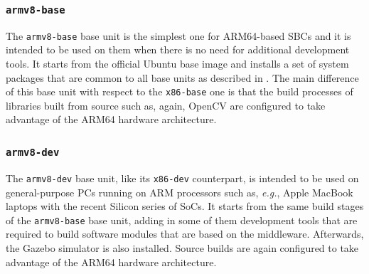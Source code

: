 \subsubsection{\texttt{armv8-base}}
\label{sec:dua_base_units_armv8-base}
The \texttt{armv8-base} base unit is the simplest one for ARM64-based SBCs and it is intended to be used on them when there is no need for additional development tools. It starts from the official Ubuntu base image and installs a set of system packages that are common to all base units as described in . The main difference of this base unit with respect to the \texttt{x86-base} one is that the build processes of libraries built from source such as, again, OpenCV are configured to take advantage of the ARM64 hardware architecture.

\subsubsection{\texttt{armv8-dev}}
\label{sec:dua_base_units_armv8-dev}
The \texttt{armv8-dev} base unit, like its \texttt{x86-dev} counterpart, is intended to be used on general-purpose PCs running on ARM processors such as, \emph{e.g.}, Apple MacBook laptops with the recent Silicon series of SoCs. It starts from the same build stages of the \texttt{armv8-base} base unit, adding in some of them development tools that are required to build software modules that are based on the \ROS middleware. Afterwards, the Gazebo simulator is also installed. Source builds are again configured to take advantage of the ARM64 hardware architecture.

